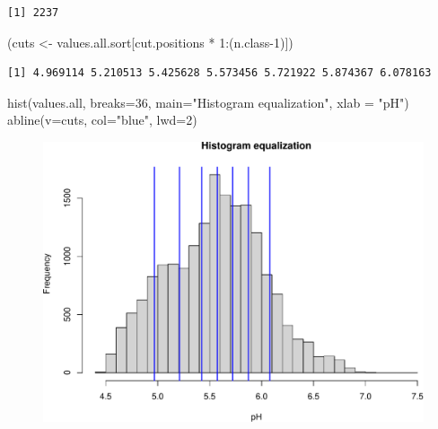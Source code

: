 \documentclass[
  letterpaper,
  DIV=11,
  numbers=noendperiod]{scrartcl}
\newenvironment{Shaded}{\begin{snugshade}}{\end{snugshade}}
\newcommand{\AttributeTok}[1]{\textcolor[rgb]{0.40,0.45,0.13}{#1}}
\newcommand{\DecValTok}[1]{\textcolor[rgb]{0.68,0.00,0.00}{#1}}
\newcommand{\FunctionTok}[1]{\textcolor[rgb]{0.28,0.35,0.67}{#1}}
\newcommand{\NormalTok}[1]{\textcolor[rgb]{0.00,0.23,0.31}{#1}}
\newcommand{\OtherTok}[1]{\textcolor[rgb]{0.00,0.23,0.31}{#1}}
\newcommand{\SpecialCharTok}[1]{\textcolor[rgb]{0.37,0.37,0.37}{#1}}
\newcommand{\StringTok}[1]{\textcolor[rgb]{0.13,0.47,0.30}{#1}}
\begin{document}
\begin{verbatim}
[1] 2237
\end{verbatim}

\begin{Shaded}
\begin{Highlighting}[]
\NormalTok{(cuts }\OtherTok{\textless{}{-}}\NormalTok{ values.all.sort[cut.positions }\SpecialCharTok{*} \DecValTok{1}\SpecialCharTok{:}\NormalTok{(n.class}\DecValTok{{-}1}\NormalTok{)])}
\end{Highlighting}
\end{Shaded}

\begin{verbatim}
[1] 4.969114 5.210513 5.425628 5.573456 5.721922 5.874367 6.078163
\end{verbatim}

\begin{Shaded}
\begin{Highlighting}[]
\FunctionTok{hist}\NormalTok{(values.all, }\AttributeTok{breaks=}\DecValTok{36}\NormalTok{, }\AttributeTok{main=}\StringTok{"Histogram equalization"}\NormalTok{,}
     \AttributeTok{xlab =} \StringTok{"pH"}\NormalTok{)}
\FunctionTok{abline}\NormalTok{(}\AttributeTok{v=}\NormalTok{cuts, }\AttributeTok{col=}\StringTok{"blue"}\NormalTok{, }\AttributeTok{lwd=}\DecValTok{2}\NormalTok{)}
\end{Highlighting}
\end{Shaded}

\begin{figure}[H]

{\centering \includegraphics{PatternAnalysisWorkshopTutorial_files/figure-pdf/histo-equal-1.pdf}

}

\end{figure}
\end{document}
